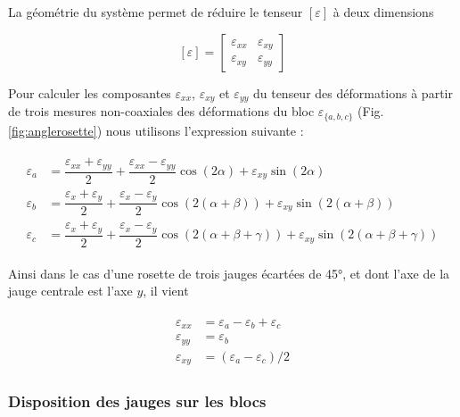 La géométrie du système permet de réduire le tenseur $[\varepsilon]$ à deux dimensions

\begin{equation}
{[\varepsilon]}
=
\begin{bmatrix}
	\varepsilon_{xx} & \varepsilon_{xy} \\
	\varepsilon_{xy} & \varepsilon_{yy}
\end{bmatrix}
\end{equation}
 

Pour calculer les composantes $\varepsilon_{xx}$, $\varepsilon_{xy}$ et $\varepsilon_{yy}$ du tenseur des déformations à partir de trois mesures non-coaxiales des déformations du bloc $\varepsilon_{\{a,b,c\}}$ (Fig.\,\ref{fig:anglerosette}) nous utilisons l'expression suivante :


\begin{align}[left=\empheqlbrace]
\begin{split}
		\varepsilon_a
	&=
		\dfrac{\varepsilon_{xx}+\varepsilon_{yy}}{2}+\dfrac{\varepsilon_{xx}-\varepsilon_{yy}}{2} \cos( 2 \alpha)+\varepsilon_{xy} \sin (2 \alpha)
	\\
		\varepsilon_b
	&=
		\dfrac{\varepsilon_x+\varepsilon_y}{2}+\dfrac{\varepsilon_x-\varepsilon_y}{2} \cos (2(\alpha+\beta))+\varepsilon_{x y} \sin (2(\alpha+\beta))
	\\
		\varepsilon_c
	&=
		\dfrac{\varepsilon_x+\varepsilon_y}{2}+\dfrac{\varepsilon_x-\varepsilon_y}{2} \cos (2(\alpha+\beta+\gamma))+\varepsilon_{x y} \sin (2(\alpha+\beta+\gamma))
\end{split}
\end{align}

Ainsi dans le cas d'une rosette de trois jauges écartées de \ang{45}, et dont l'axe de la jauge centrale est l'axe $y$, il vient

\begin{align}[left=\empheqlbrace]
\label{eq:rotation}
\begin{split}
		\varepsilon_{xx}
	&=
		\varepsilon_{a}-\varepsilon_{b}+\varepsilon_{c}
	\\
		\varepsilon_{yy}
	&=
		\varepsilon_{b}
	\\
		\varepsilon_{xy}
	&=
		\left(\varepsilon_{a}-\varepsilon_{c}\right)/2
\end{split}
\end{align}




\subsubsection{Disposition des jauges sur les blocs}


